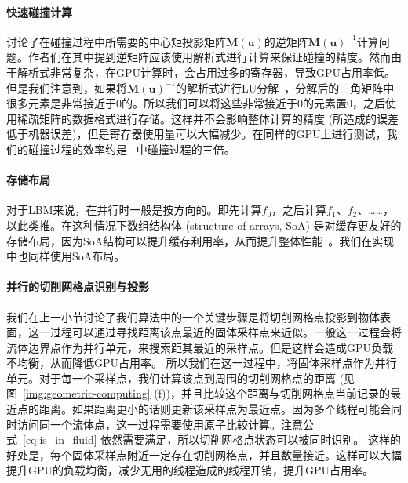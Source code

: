 \paragraph{快速碰撞计算}
\citet{Chen-2021} 讨论了在碰撞过程中所需要的中心矩投影矩阵$\bm{M}(\bm{u})$的逆矩阵$\bm{M}(\bm{u})^{-1}$计算问题。作者们在其中提到逆矩阵应该使用解析式进行计算来保证碰撞的精度。然而由于解析式非常复杂，在GPU计算时，会占用过多的寄存器，导致GPU占用率低。但是我们注意到，如果将$\bm{M}(\bm{u})^{-1}$的解析式进行LU分解~\citep{fei2018three}，分解后的三角矩阵中很多元素是非常接近于0的。所以我们可以将这些非常接近于0的元素置0，之后使用稀疏矩阵的数据格式进行存储。这样并不会影响整体计算的精度 (所造成的误差低于机器误差)，但是寄存器使用量可以大幅减少。在同样的GPU上进行测试，我们的碰撞过程的效率约是~\citep{Chen-2021} 中碰撞过程的三倍。

\paragraph{存储布局}
对于LBM来说，在并行时一般是按方向的。即先计算$f_0$，之后计算$f_1$、$f_2$、……，以此类推。在这种情况下数组结构体 (structure-of-arrays, SoA) 是对缓存更友好的存储布局，因为SoA结构可以提升缓存利用率，从而提升整体性能~\citep{Chen-2021}。我们在实现中也同样使用SoA布局。

\paragraph{并行的切削网格点识别与投影}
我们在上一小节讨论了我们算法中的一个关键步骤是将切削网格点投影到物体表面，这一过程可以通过寻找距离该点最近的固体采样点来近似。一般这一过程会将流体边界点作为并行单元，来搜索距其最近的采样点。但是这样会造成GPU负载不均衡，从而降低GPU占用率。
所以我们在这一过程中，将固体采样点作为并行单元。对于每一个采样点，我们计算该点到周围的切削网格点的距离 (见图~\ref{img:geometric-computing} (f))，并且比较这个距离与切削网格点当前记录的最近点的距离。如果距离更小的话则更新该采样点为最近点。因为多个线程可能会同时访问同一个流体点，这一过程需要使用原子比较计算。注意公式~\ref{eq:is_in_fluid} 依然需要满足，所以切削网格点状态可以被同时识别。
这样的好处是，每个固体采样点附近一定存在切削网格点，并且数量接近。这样可以大幅提升GPU的负载均衡，减少无用的线程造成的线程开销，提升GPU占用率。

